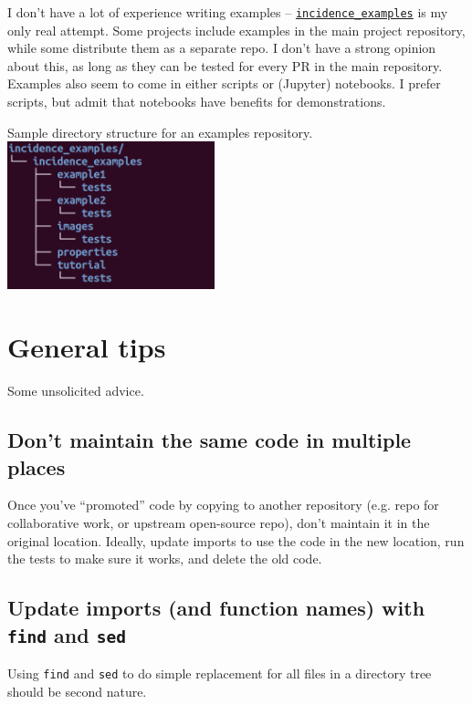 \documentclass{article}
\begin{document}
I don't have a lot of experience writing examples --
\href{https://github.com/Robbybp/incidence_examples}{\texttt{incidence\_examples}}
is my only real attempt. Some projects include examples in the main project
repository, while some distribute them as a separate repo.
I don't have a strong opinion about this, as long as they can be tested
for every PR in the main repository.
Examples also seem to come in either scripts or (Jupyter) notebooks.
I prefer scripts, but admit that notebooks have benefits for demonstrations.

\begin{center}
  Sample directory structure for an examples repository.\\
  \includegraphics[width=6cm]{incidence_examples_tree_small}
\end{center}

\section{General tips}
Some unsolicited advice.

\subsection{Don't maintain the same code in multiple places}
Once you've ``promoted'' code by copying to another repository
(e.g. repo for collaborative work, or upstream open-source repo),
don't maintain it in the original location.
Ideally, update imports to use the code in the new location,
run the tests to make sure it works, and delete the old code.

\subsection{Update imports (and function names) with
\texttt{find} and \texttt{sed}}
Using \texttt{find} and \texttt{sed} to do simple replacement
for all files in a directory tree should be second nature.
\end{document}
